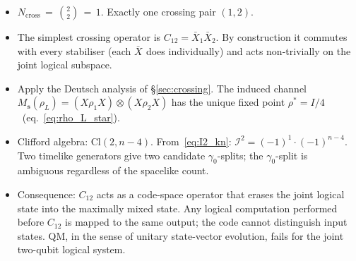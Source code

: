 \documentclass[11pt,a4paper]{article}
\providecommand{\Cl}[1]{\mathrm{Cl}(#1)}
\newcommand{\Ms}{M_{\mathbf{s}}}
\newcommand{\Lx}[1]{\bar{X}_{#1}}
\begin{document}
\begin{itemize}\setlength\itemsep{2pt}
  \item $N_{\mathrm{cross}} \,=\, \binom{2}{2} \,=\, 1$. Exactly one crossing pair $(1,2)$.
  \item The simplest crossing operator is $C_{12}=\Lx{1}\Lx{2}$. By construction it commutes with every stabiliser (each $\Lx{}$ does individually) and acts non-trivially on the joint logical subspace.
  \item Apply the Deutsch analysis of \S\ref{sec:crossing}. The induced channel
  \(
    \Ms(\rho_L) = (X\rho_1X)\otimes(X\rho_2X)
  \)
  has the unique fixed point $\rho^*=I/4$~(eq.~\eqref{eq:rho_L_star}).
  \item Clifford algebra: $\Cl{2,n-4}$. From~\eqref{eq:I2_kn}: $\mathcal{I}^2 = (-1)^{1}\cdot(-1)^{n-4}$. Two timelike generators give two candidate $\gamma_0$-splits; the $\gamma_0$-split is ambiguous regardless of the spacelike count.
  \item Consequence: $C_{12}$ acts as a code-space operator that erases the joint logical state into the maximally mixed state. Any logical computation performed before $C_{12}$ is mapped to the same output; the code cannot distinguish input states. QM, in the sense of unitary state-vector evolution, fails for the joint two-qubit logical system.
\end{itemize}
\end{document}
